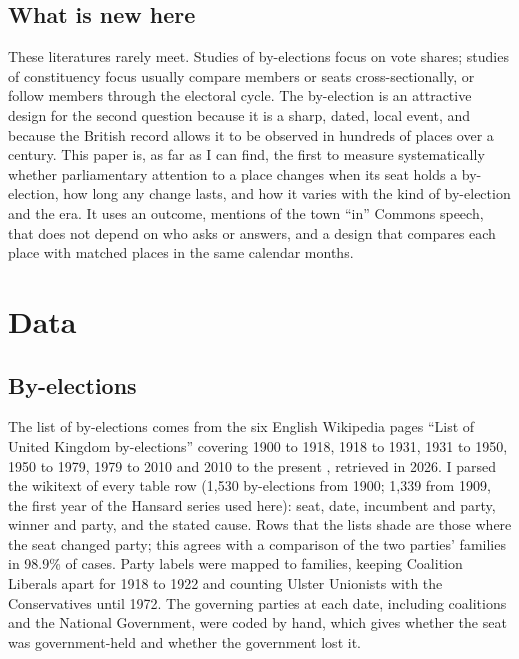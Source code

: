 \documentclass[11pt,a4paper]{article}
\begin{document}
\subsection{What is new here}
These literatures rarely meet. Studies of by-elections focus on vote shares; studies of constituency focus usually compare members or seats cross-sectionally, or follow members through the electoral cycle. The by-election is an attractive design for the second question because it is a sharp, dated, local event, and because the British record allows it to be observed in hundreds of places over a century. This paper is, as far as I can find, the first to measure systematically whether parliamentary attention to a place changes when its seat holds a by-election, how long any change lasts, and how it varies with the kind of by-election and the era. It uses an outcome, mentions of the town ``in'' Commons speech, that does not depend on who asks or answers, and a design that compares each place with matched places in the same calendar months.

\section{Data}\label{sec:data}
\subsection{By-elections}
The list of by-elections comes from the six English Wikipedia pages ``List of United Kingdom by-elections'' covering 1900 to 1918, 1918 to 1931, 1931 to 1950, 1950 to 1979, 1979 to 2010 and 2010 to the present \citep{wikipedia2026}, retrieved in 2026. I parsed the wikitext of every table row (1,530 by-elections from 1900; 1,339 from 1909, the first year of the Hansard series used here): seat, date, incumbent and party, winner and party, and the stated cause. Rows that the lists shade are those where the seat changed party; this agrees with a comparison of the two parties' families in 98.9\% of cases. Party labels were mapped to families, keeping Coalition Liberals apart for 1918 to 1922 and counting Ulster Unionists with the Conservatives until 1972. The governing parties at each date, including coalitions and the National Government, were coded by hand, which gives whether the seat was government-held and whether the government lost it.
\end{document}

